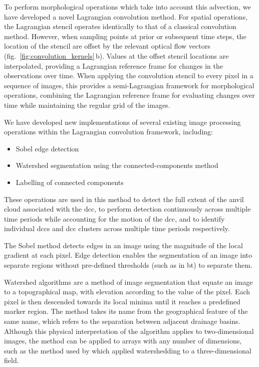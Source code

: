 To perform morphological operations which take into account this advection, we have developed a novel Lagrangian convolution method.
For spatial operations, the Lagrangian stencil operates identically to that of a classical convolution method.
However, when sampling points at prior or subsequent time steps, the location of the stencil are offset by the relevant optical flow vectors (fig.~\ref{fig:convolution_kernels}\,b).
Values at the offset stencil locations are interpolated, providing a Lagrangian reference frame for changes in the observations over time.
When applying the convolution stencil to every pixel in a sequence of images, this provides a semi-Lagrangian framework for morphological operations, combining the Lagrangian reference frame for evaluating changes over time while maintaining the regular grid of the images.

We have developed new implementations of several existing image processing operations within the Lagrangian convolution framework, including:
\begin{itemize}
    \item Sobel edge detection \citep{sobel_isotropic_2014}
    \item Watershed segmentation using the connected-components method \citep{bieniek_efficient_2000}
    \item Labelling of connected components \citep{hoshen_percolation_1976}
\end{itemize}

These operations are used in this method to detect the full extent of the anvil cloud associated with the \acrshort{dcc}, to perform detection continuously across multiple time periods while accounting for the motion of the \acrshort{dcc}, and to identify individual \acrshort{dcc}s and \acrshort{dcc} clusters across multiple time periods respectively.

The Sobel method detects edges in an image using the magnitude of the local gradient at each pixel.
Edge detection enables the segmentation of an image into separate regions without pre-defined thresholds (such as in \acrshort{bt}) to separate them.

Watershed algorithms are a method of image segmentation that equate an image to a topographical map, with elevation according to the value of the pixel.
Each pixel is then descended towards its local minima until it reaches a predefined marker region.
The method takes its name from the geographical feature of the same name, which refers to the separation between adjacent drainage basins.
Although this physical interpretation of the algorithm applies to two-dimensional images, the method can be applied to arrays with any number of dimensions, such as the method used by \citet{fiolleau_algorithm_2013} which applied watershedding to a three-dimensional field.

